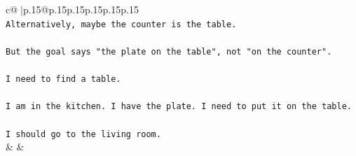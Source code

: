 \documentclass{article}
\begin{document}
{\begin{supertabular}{c@{$\;$}|p{.15\linewidth}@{}p{.15\linewidth}p{.15\linewidth}p{.15\linewidth}p{.15\linewidth}p{.15\linewidth}}
{{{\\ 
\texttt{Alternatively, maybe the counter is the table.} \\
\\ 
\texttt{But the goal says "the plate on the table", not "on the counter".} \\
\\ 
\texttt{I need to find a table.} \\
\\ 
\texttt{I am in the kitchen. I have the plate. I need to put it on the table.} \\
\\ 
\texttt{I should go to the living room.} \\
            }
        }
    }
    & & \\ \\


\end{supertabular}}
\end{document}
